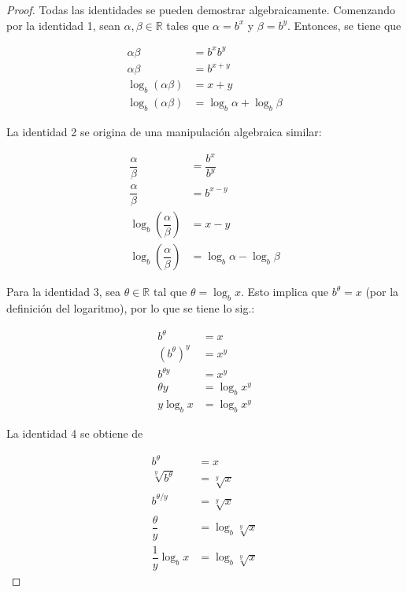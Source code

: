 \begin{proof}
    Todas las identidades se pueden demostrar algebraicamente. Comenzando
    por la identidad 1, sean $\alpha,\beta\in\mathbb{R}$ tales que $\alpha=b^{x}$
    y $\beta=b^{y}$. Entonces, se tiene que

    \begin{align*}
        \alpha\beta &= b^{x}b^{y}\\
        \alpha\beta &= b^{x+y}\\
        \log_{b}(\alpha\beta) &= x+y\\
        \log_{b}(\alpha\beta) &= \log_{b}\alpha+\log_{b}\beta
    \end{align*}
    
    La identidad 2 se origina de una manipulación algebraica similar:
    
    \begin{align*}
        \dfrac{\alpha}{\beta} &= \dfrac{b^{x}}{b^{y}}\\
        \dfrac{\alpha}{\beta} &= b^{x-y}\\
        \log_{b}\left(\dfrac{\alpha}{\beta}\right) &= x-y\\
        \log_{b}\left(\dfrac{\alpha}{\beta}\right) &= \log_{b}\alpha-\log_{b}\beta
    \end{align*}
    
    Para la identidad 3, sea $\theta\in\mathbb{R}$ tal que $\theta=\log_{b}x$.
    Esto implica que $b^{\theta}=x$ (por la definición del logaritmo),
    por lo que se tiene lo sig.:

    \begin{align*}
        b^{\theta} &= x\\
        (b^{\theta})^{y} &= x^{y}\\
        b^{\theta y} &= x^{y}\\
        \theta y &= \log_{b}x^{y}\\
        y\log_{b}x &= \log_{b}x^{y}
    \end{align*}
    
    La identidad 4 se obtiene de
    
    \begin{align*}
        b^{\theta} &= x\\
        \sqrt[y]{b^{\theta}} &= \sqrt[y]{x}\\
        b^{\theta/y} &= \sqrt[y]{x}\\
        \dfrac{\theta}{y} &= \log_{b}\sqrt[y]{x}\\
        \dfrac{1}{y}\log_{b}x &= \log_{b}\sqrt[y]{x}
    \end{align*}
    

\end{proof}
